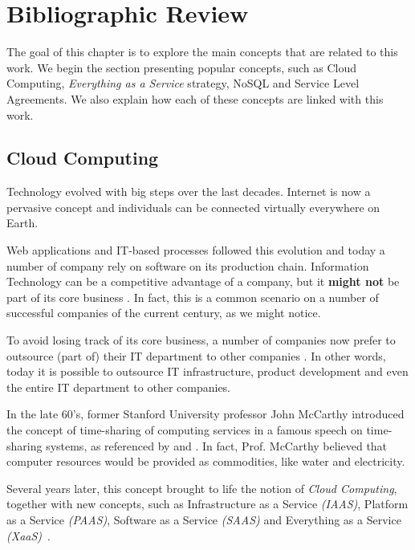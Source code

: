 \chapter{Bibliographic Review}\label{bibreviewChap}

The goal of this chapter is to explore the main concepts that are related to this work. We begin the section presenting popular concepts, such as Cloud Computing, \textit{Everything as a Service} strategy, NoSQL and Service Level Agreements. 
We also explain how each of these concepts are linked with this work.

\section{Cloud Computing}

Technology evolved with big steps over the last decades. Internet is now a pervasive concept and individuals can be connected virtually everywhere on Earth. \cite{Armbrust09m.:above}

Web applications and IT-based processes followed this evolution and today a number of company rely on software on its production chain. Information Technology can be a competitive advantage of a company, but it \textbf{might not}  be part of its core business \cite{powell1997information}. In fact, this is a common scenario on a number of successful companies of the current century, as we might notice.

To avoid losing track of its core business, a number of companies now prefer to outsource (part of) their IT department to other companies \cite{quinn2013technology}. In other words, today it is possible to outsource IT infrastructure, product development and even the entire IT department to other companies.

In the late 60's, former Stanford University professor John McCarthy introduced the concept of time-sharing of computing services in a famous speech on time-sharing systems, as referenced by \cite{brendon} and \cite{wiki:mccarthy}. In fact, Prof. McCarthy believed that computer resources would be provided as commodities, like water and electricity.

Several years later, this concept brought to life the notion of \textit{Cloud Computing}, together with new concepts, such as Infrastructure as a Service \textit{(IAAS)}, Platform as a Service \textit{(PAAS)}, Software as a Service \textit{(SAAS)} and Everything as a Service \textit{(XaaS)}~\cite{AViewOfCloudComputing}.

